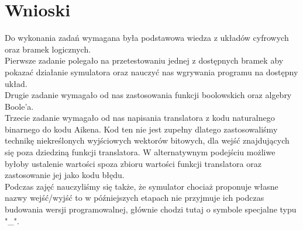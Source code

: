 \documentclass[a4paper,12pt]{extarticle}  %
\begin{document}
\section{Wnioski}
Do wykonania zadań wymagana była podstawowa wiedza z układów cyfrowych oraz bramek logicznych.\\
Pierwsze zadanie polegało na przetestowaniu jednej z dostępnych bramek aby pokazać działanie symulatora oraz nauczyć nas wgrywania programu na dostępny układ.\\
Drugie zadanie wymagało od nas zastosowania funkcji boolowskich oraz algebry Boole'a.\\
Trzecie zadanie wymagało od nas napisania translatora z kodu naturalnego binarnego do kodu Aikena. Kod ten nie jest zupełny dlatego zastosowaliśmy technikę niekreślonych wyjściowych wektorów bitowych, dla wejść znajdujących się poza dziedziną funkcji translatora. W alternatywnym podejściu możliwe byłoby ustalenie wartości spoza zbioru wartości funkcji translatora oraz zastosowanie jej jako kodu błędu.\\
Podczas zajęć nauczyliśmy się także, że symulator chociaż proponuje własne nazwy wejść/wyjść to w późniejszych etapach nie przyjmuje ich podczas budowania wersji programowalnej, głównie chodzi tutaj o symbole specjalne typu "\_".
\end{document}
